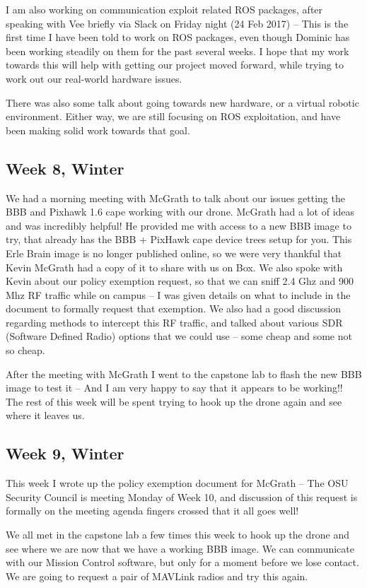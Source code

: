 I am also working on communication exploit related ROS packages, after speaking with Vee briefly via Slack on Friday night (24 Feb 2017) -- This is the first time I have been told to work on ROS packages, even though Dominic has been working steadily on them for the past several weeks. I hope that my work towards this will help with getting our project moved forward, while trying to work out our real-world hardware issues.

There was also some talk about going towards new hardware, or a virtual robotic environment. Either way, we are still focusing on ROS exploitation, and have been making solid work towards that goal.
\subsection{Week 8, Winter}
We had a morning meeting with McGrath to talk about our issues getting the BBB and Pixhawk 1.6 cape working with our drone. McGrath had a lot of ideas and was incredibly helpful! He provided me with access to a new BBB image to try, that already has the BBB + PixHawk cape device trees setup for you. This Erle Brain image is no longer published online, so we were very thankful that Kevin McGrath had a copy of it to share with us on Box. We also spoke with Kevin about our policy exemption request, so that we can sniff 2.4 Ghz and 900 Mhz RF traffic while on campus -- I was given details on what to include in the document to formally request that exemption. We also had a good discussion regarding methods to intercept this RF traffic, and talked about various SDR (Software Defined Radio) options that we could use -- some cheap and some not so cheap.

After the meeting with McGrath I went to the capstone lab to flash the new BBB image to test it -- And I am very happy to say that it appears to be working!! The rest of this week will be spent trying to hook up the drone again and see where it leaves us.
\subsection{Week 9, Winter}
This week I wrote up the policy exemption document for McGrath -- The OSU Security Council is meeting Monday of Week 10, and discussion of this request is formally on the meeting agenda fingers crossed that it all goes well!

We all met in the capstone lab a few times this week to hook up the drone and see where we are now that we have a working BBB image. We can communicate with our Mission Control software, but only for a moment before we lose contact. We are going to request a pair of MAVLink radios and try this again.

